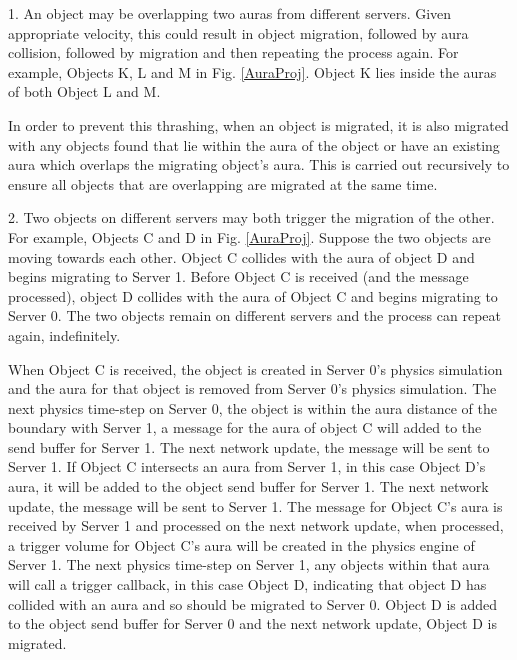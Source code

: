 1. An object may be overlapping two auras from different servers. Given appropriate velocity, this could result in object migration, followed by aura collision, followed by migration and then repeating the process again. For example, Objects K, L and M in Fig. \ref{AuraProj}. Object K lies inside the auras of both Object L and M. 

In order to prevent this thrashing, when an object is migrated, it is also migrated with any objects found that lie within the aura of the object or have an existing aura which overlaps the migrating object's aura. This is carried out recursively to ensure all objects that are overlapping are migrated at the same time.

2. Two objects on different servers may both trigger the migration of the other. For example, Objects C and D in Fig. \ref{AuraProj}. Suppose the two objects are moving towards each other. Object C collides with the aura of object D and begins migrating to Server 1. Before Object C is received (and the message processed), object D collides with the aura of Object C and begins migrating to Server 0. The two objects remain on different servers and the process can repeat again, indefinitely.

When Object C is received, the object is created in Server 0's physics simulation and the aura for that object is removed from Server 0's physics simulation. 
The next physics time-step on Server 0, the object is within the aura distance of the boundary with Server 1, a message for the aura of object C will added to the send buffer for Server 1. The next network update, the message will be sent to Server 1.
If Object C intersects an aura from Server 1, in this case Object D's aura, it will be added to the object send buffer for Server 1. The next network update, the message will be sent to Server 1. %
The message for Object C's aura is received by Server 1 and processed on the next network update, when processed, a trigger volume for Object C's aura will be created in the physics engine of Server 1. The next physics time-step on Server 1, any objects within that aura will call a trigger callback, in this case Object D, indicating that object D has collided with an aura and so should be migrated to Server 0. Object D is added to the object send buffer for Server 0 and the next network update, Object D is migrated.




